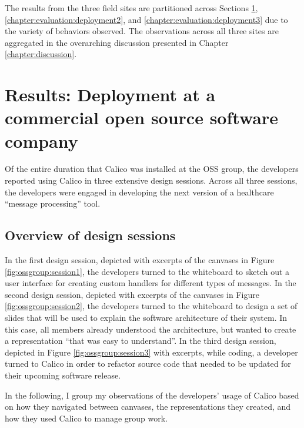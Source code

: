 The results from the three field sites are partitioned across Sections \ref{chapter:evaluation:deployment1}, \ref{chapter:evaluation:deployment2}, and \ref{chapter:evaluation:deployment3} due to the variety of behaviors observed. The observations across all three sites are aggregated in the overarching discussion presented in Chapter \ref{chapter:discussion}.

\section{Results: Deployment at a commercial open source software company}
\label{chapter:evaluation:deployment1}

Of the entire duration that Calico was installed at the OSS group, the developers reported using Calico in three extensive design sessions. Across all three sessions, the developers were engaged in developing the next version of a healthcare ``message processing'' tool. 

\subsection{Overview of design sessions}

In the first design session, depicted with excerpts of the canvases in Figure \ref{fig:ossgroup:session1}, the developers turned to the whiteboard to sketch out a user interface for creating custom handlers for different types of messages. In the second design session, depicted with excerpts of the canvases in Figure \ref{fig:ossgroup:session2}, the developers turned to the whiteboard to design a set of slides that will be used to explain the software architecture of their system. In this case, all members already understood the architecture, but wanted to create a representation ``that was easy to understand''. In the third design session, depicted in Figure \ref{fig:ossgroup:session3} with excerpts, while coding, a developer turned to Calico in order to refactor source code that needed to be updated for their upcoming software release.

In the following, I group my observations of the developers' usage of Calico based on how they navigated between canvases, the representations they created, and how they used Calico to manage group work.

